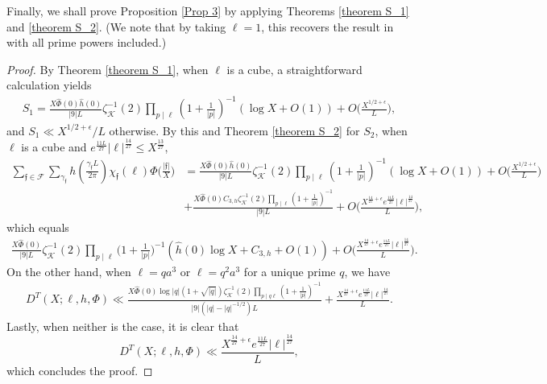 \documentclass[11pt]{amsart}
\numberwithin{equation}{section}
\theoremstyle{remark}
\begin{document}
Finally, we shall prove Proposition \ref{Prop 3} by applying Theorems \ref{theorem S_1} and \ref{theorem S_2}. (We note that by taking $\ell=1$, this recovers the result in \cite{DG} with all prime powers included.)

\begin{proof}
By Theorem \ref{theorem S_1}, when $\ell$ is a cube, a straightforward calculation yields
\begin{align*}
    S_1=\frac{X\widehat{\Phi}(0)\hat{h}(0)}{|9|L}  \zeta^{-1}_\mathcal{K}(2)  \prod_{p\mid \ell}\left(1+\frac{1}{|p|}\right)^{-1} (\log X +O(1))
    +O\bigg(\frac{X^{1/2+\epsilon}}{L}\bigg),
\end{align*}
and $S_1\ll X^{1/2+\epsilon}/{L}$ otherwise.
By this and Theorem \ref{theorem S_2} for $S_2$, when $\ell$ is a cube and $e^{\frac{11L}{27}}|\ell|^{\frac{14}{27}}\le X^{\frac{13}{27}}$,
\begin{align*}
    \sum_{\mathfrak{f}\in\mathcal{F}} \sum_{\gamma_{\mathfrak{f}}} h\left( \frac{\gamma_{\mathfrak{f}} L}{2\pi}\right)\chi_\mathfrak{f}(\ell) \Phi\bigg(\frac{|\mathfrak{f}|}{X}\bigg)
    &=
 \frac{X\widehat{\Phi}(0)\hat{h}(0)}{|9|L}  \zeta^{-1}_\mathcal{K}(2)  \prod_{p\mid \ell}\left(1+\frac{1}{|p|}\right)^{-1} (\log X +O(1))
    +O\bigg(\frac{X^{1/2+\epsilon}}{L}\bigg)
    \\
    &+
    \frac{X\widehat{\Phi}(0)C_{3,h}\zeta^{-1}_\mathcal{K}(2)  \prod_{p\mid \ell}(1+\frac{1}{|p|})^{-1}}{|9|L}
    +O\bigg(\frac{X^{\frac{14}{27}+\epsilon}e^{\frac{11L}{27}}|\ell|^{\frac{14}{27}}}{L} \bigg),
\end{align*}
 which equals
 \begin{align*}
 \frac{X\widehat{\Phi}(0)}{|9|L}  \zeta^{-1}_\mathcal{K}(2)  \prod_{p\mid \ell}\bigg(1+\frac{1}{|p|}\bigg)^{-1} 
 \left(\hat{h}(0) \log X + C_{3,h}+O(1)\right) 
 + O\bigg( \frac{X^{\frac{14}{27}+\epsilon}e^{\frac{11L}{27}}|\ell|^{\frac{14}{27}}}{L} \bigg).
\end{align*}
On the other hand, when $\ell=qa^3$  or $\ell= q^2a^3$ for a unique prime $q$, we have
\begin{align*}
  D^T(X;\ell,h, \Phi)
    \ll
     \frac{X\widehat{\Phi}(0)\log|q|(1+\sqrt{|q|})\zeta^{-1}_\mathcal{K}(2)  \prod_{p\mid q \ell }(1+\frac{1}{|p|})^{-1}}{|9|(|q|-|q|^{-1/2})L} 
    + 
    \frac{X^{\frac{14}{27}+\epsilon}e^{\frac{11L}{27}}|\ell|^{\frac{14}{27}}}{L}.
\end{align*}
Lastly, when neither is the case, it is clear that
    $$D^T(X;\ell,h, \Phi)
    \ll
    \frac{X^{\frac{14}{27}+\epsilon}e^{\frac{11L}{27}}|\ell|^{\frac{14}{27}}}{L},$$
    which concludes the proof.
\end{proof}
\end{document}
